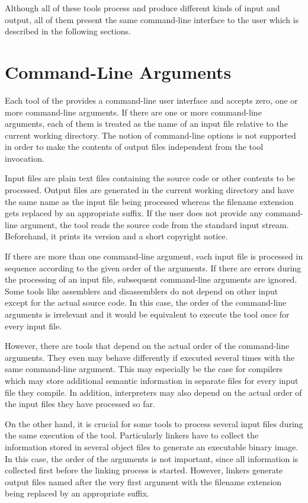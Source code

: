 Although all of these tools process and produce different kinds of input and output, all of them present the same command-line interface to the user which is described in the following sections.

\section{Command-Line Arguments}

Each tool of the \ecs{} provides a command-line user interface and accepts zero, one or more command-line arguments.
If there are one or more command-line arguments, each of them is treated as the name of an input file relative to the current working directory.
The notion of command-line options is not supported in order to make the contents of output files independent from the tool invocation.

Input files are plain text files containing the source code or other contents to be processed.
Output files are generated in the current working directory and have the same name as the input file being processed whereas the filename extension gets replaced by an appropriate suffix.
If the user does not provide any command-line argument, the tool reads the source code from the standard input stream.
Beforehand, it prints its version and a short copyright notice.

If there are more than one command-line argument, each input file is processed in sequence according to the given order of the arguments.
If there are errors during the processing of an input file, subsequent command-line arguments are ignored.
Some tools like assemblers and disassemblers do not depend on other input except for the actual source code.
In this case, the order of the command-line arguments is irrelevant and it would be equivalent to execute the tool once for every input file.

However, there are tools that depend on the actual order of the command-line arguments.
They even may behave differently if executed several times with the same command-line argument.
This may especially be the case for compilers which may store additional semantic information in separate files for every input file they compile.
In addition, interpreters may also depend on the actual order of the input files they have processed so far.

On the other hand, it is crucial for some tools to process several input files during the same execution of the tool.
Particularly linkers have to collect the information stored in several object files to generate an executable binary image.
In this case, the order of the arguments is not important, since all information is collected first before the linking process is started.
However, linkers generate output files named after the very first argument with the filename extension being replaced by an appropriate suffix.


